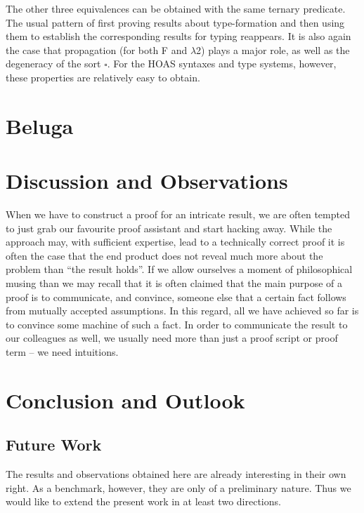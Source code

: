 \documentclass[a4paper,UKenglish]{lipics-v2016}
\newcommand{\SysL}{$\lambda$2\xspace}
\newcommand{\Typ}{\ensuremath{\square}}
\begin{document}
The other three equivalences can be obtained with the same ternary predicate.
The usual pattern of first proving results about type-formation and then using them to establish the corresponding results for typing reappears.
It is also again the case that propagation (for both F and \SysL) plays a major role, as well as the degeneracy of the sort $\Typ$.
For the HOAS syntaxes and type systems, however, these properties are relatively easy to obtain.

\section{Beluga}
\label{sec:beluga}


\section{Discussion and Observations}
\label{sec:disc-observ}

When we have to construct a proof for an intricate result, we are often tempted to just grab our favourite proof assistant and start hacking away.
While the approach may, with sufficient expertise, lead to a technically correct proof it is often the case that the end product does not reveal much more about the problem than ``the result holds''.
If we allow ourselves a moment of philosophical musing than we may recall that it is often claimed that the main purpose of a proof is to communicate, and convince, someone else that a certain fact follows from mutually accepted assumptions.
In this regard, all we have achieved so far is to convince some machine of such a fact.
In order to communicate the result to our colleagues as well, we usually need more than just a proof script or proof term -- we need intuitions.


\section{Conclusion and Outlook}
\label{sec:conclusion}

\subsection{Future Work}
\label{sec:future-work}

The results and observations obtained here are already interesting in their own right.
As a benchmark, however, they are only of a preliminary nature.
Thus we would like to extend the present work in at least two directions.
\end{document}

